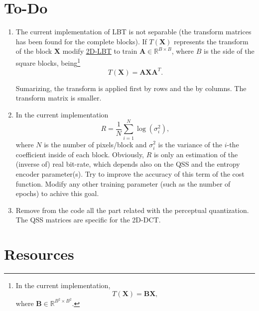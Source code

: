 \section{To-Do}
\begin{enumerate}
  \item The current implementation of LBT is not separable (the
    transform matrices has been found for the complete blocks). If
    $T(\mathbf{X})$ represents the transform of the block $\mathbf{X}$
    modify
    \href{https://github.com/Sistemas-Multimedia/VCF/blob/main/notebooks/2D-LBT.py}{2D-LBT}
    to train $\mathbf{A}\in\mathbb{R}^{B\times B}$, where $B$ is the
    side of the square blocks, being\footnote{In the current
    implementation,
    \begin{equation}
      T(\mathbf{X}) = \mathbf{B}\mathbf{X},
    \end{equation}
    where $\mathbf{B}\in\mathbb{R}^{B^2\times B^2}$.}
    \begin{equation}
      T(\mathbf{X}) = \mathbf{A}\mathbf{X}\mathbf{A}^T.
    \end{equation}
    
    Sumarizing, the transform is applied first by rows and the by
    columns. The transform matrix is smaller.

  \item In the current implementation
    \begin{equation}
      R = \frac{1}{N}\sum_{i=1}^{N} \log(\sigma_i^2),
    \end{equation}
    where $N$ is the number of pixels/block and $\sigma^2_i$ is the
    variance of the $i$-the coefficient inside of each block.
    Obviously, $R$ is only an estimation of the (inverse of) real
    bit-rate, which depends also on the QSS and the entropy encoder
    parameter(s). Try to improve the accuracy of this term of the cost
    function. Modify any other training parameter (such as the number
    of epochs) to achive this goal.

  \item Remove from the code all the part related with the perceptual
    quantization. The QSS matrices are specific for the 2D-DCT.
    
\end{enumerate}

\section{Resources}

